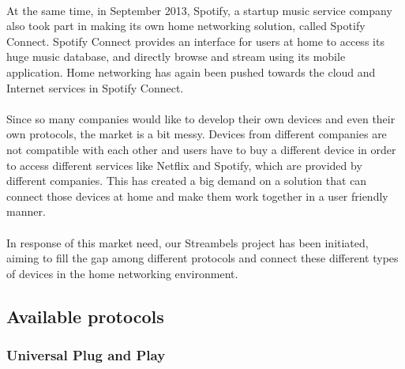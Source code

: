 \\
At the same time, in September 2013, Spotify, a startup music service 
company also took part in making its own home networking solution, called 
Spotify Connect. Spotify Connect provides an interface for users at home to access its huge 
music database, and directly browse and stream using its mobile application. Home 
networking has again been pushed towards the cloud and Internet services in Spotify Connect. \\
\\
Since so many companies would like to develop their own devices and even their 
own protocols, the market is a bit messy. Devices from different companies are not compatible with each other and users have to buy a different device in order to access different services like Netflix and Spotify, which are provided by different companies.  This has created a big demand on a solution that can connect those devices at home and make them work together in a user friendly manner. \\
\\
In response of this market need, our Streambels project has been initiated, aiming to fill the gap among different protocols and connect these different types of devices in the home networking environment.
\subsection{Available protocols} 
\subsubsection[Universal Plug and Play]{Universal Plug and Play}

